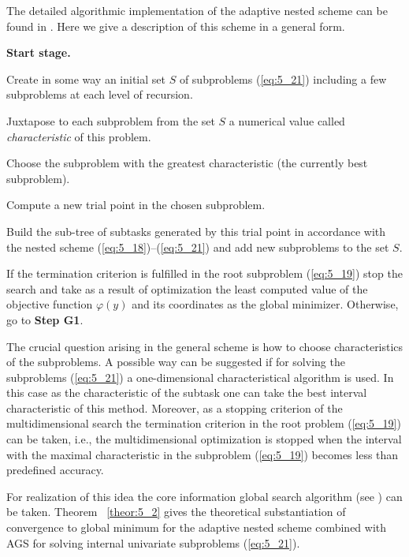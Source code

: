 The detailed algorithmic implementation of the adaptive nested scheme can be found in \cite{5_GerGriGer}. Here we give a description of this scheme in a general form.

\textbf{Start stage.}

Create in some way an initial set $S$  of subproblems (\ref{eq:5_21}) including a few subproblems at each level of recursion.
\begin{description} 
\item [\textbf{Step G1.}] {Juxtapose to each subproblem from the set $S$ a numerical value called \textit{characteristic} of this problem.}
\item [\textbf{Step G2.}] {Choose the subproblem with the greatest characteristic (the currently best subproblem).}
\item [\textbf{Step G3.}]{Compute a new trial point in the chosen subproblem.}
\item [\textbf{Step G4.}]{Build the sub-tree of subtasks generated by this trial point in accordance with the nested scheme  (\ref{eq:5_18})--(\ref{eq:5_21}) and add new subproblems to the set $S$.}
\item [\textbf{Step G5.}]{If the termination  criterion is fulfilled in the root subproblem (\ref{eq:5_19}) stop the search and take as a result of optimization the least computed value of the objective function $\varphi(y)$ and its coordinates as the global minimizer. Otherwise, go to \textbf{Step G1}.}
\end{description}

The crucial question arising in the general scheme is how to choose characteristics of the subproblems.  A possible way can be suggested if for solving the subproblems (\ref{eq:5_21}) a one-dimensional characteristical algorithm is used. In this case as the characteristic of the subtask one can take the best interval characteristic of this method. Moreover, as a stopping criterion of the multidimensional search the termination criterion  in the root problem (\ref{eq:5_19}) can be taken, i.e., the multidimensional optimization is stopped when the interval with the maximal characteristic in the subproblem (\ref{eq:5_19}) becomes less than predefined accuracy. 

For realization of this idea the core information  global search algorithm  (see \cite{5_GriKvaMukhStr, 5_StrSergMon2000}) can be taken. Theorem ~\ref{theor:5_2} gives the theoretical substantiation of convergence to global minimum for the adaptive nested scheme combined with AGS for solving internal univariate subproblems (\ref{eq:5_21}).

